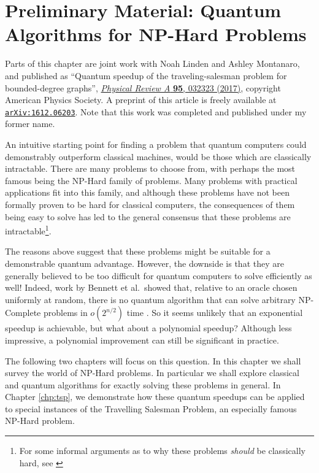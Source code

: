 \chapter{Preliminary Material: Quantum Algorithms for NP-Hard Problems}
\label{chp:prelim-q-c}

Parts of this chapter are joint work with Noah Linden and Ashley Montanaro, and published as ``Quantum speedup of the traveling-salesman problem for bounded-degree graphs'', \href{https://link.aps.org/doi/10.1103/PhysRevA.95.032323}{\textit{Physical Review A} \textbf{95}, 032323 (2017)}, copyright American Physics Society. A preprint of this article is freely available at {\tt \href{https://arxiv.org/abs/1612.06203}{arXiv:1612.06203}}. Note that this work was completed and published under my former name.

An intuitive starting point for finding a problem that quantum computers could demonstrably outperform classical machines, would be those which are classically intractable. There are many problems to choose from, with perhaps the most famous being the NP-Hard family of problems. Many problems with practical applications fit into this family, and although these problems have not been formally proven to be hard for classical computers, the consequences of them being easy to solve has led to the general consensus that these problems are intractable\footnote{For some informal arguments as to why these problems \textit{should} be classically hard, see \cite{aaronson2006}}.

The reasons above suggest that these problems might be suitable for a demonstrable quantum advantage. However, the downside is that they are generally believed to be too difficult for quantum computers to solve efficiently as well! Indeed, work by Bennett et al.\ showed that, relative to an oracle chosen uniformly at random, there is no quantum algorithm that can solve arbitrary NP-Complete problems in $o(2^{n/2})$ time \cite{bennett1997}. So it seems unlikely that an exponential speedup is achievable, but what about a polynomial speedup? Although less impressive, a polynomial improvement can still be significant in practice.

The following two chapters will focus on this question. In this chapter we shall survey the world of NP-Hard problems. In particular we shall explore classical and quantum algorithms for exactly solving these problems in general. In Chapter \ref{chp:tsp}, we demonstrate how these quantum speedups can be applied to special instances of the Travelling Salesman Problem, an especially famous NP-Hard problem.

